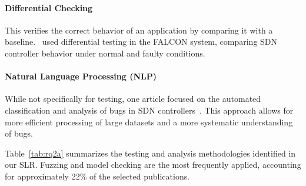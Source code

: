 \paragraph{Differential Checking} This verifies the correct behavior of an application by comparing it with a baseline.~\cite{8717815} used differential testing in the FALCON system, comparing SDN controller behavior under normal and faulty conditions.

\paragraph{Natural Language Processing (NLP)} While not specifically for testing, one article focused on the automated classification and analysis of bugs in SDN controllers~\citep{9505089}. This approach allows for more efficient processing of large datasets and a more systematic understanding of bugs.

Table~\ref{tab:rq2a} summarizes the testing and analysis methodologies identified in our SLR. Fuzzing and model checking are the most frequently applied, accounting for approximately 22\% of the selected publications.

